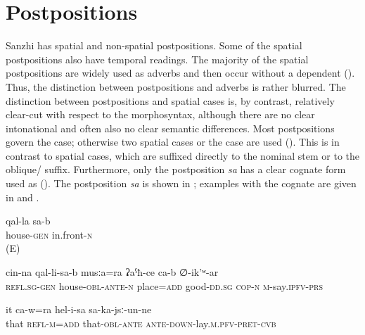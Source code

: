 \chapter{Postpositions}\label{cpt:postpositions}

Sanzhi has spatial and non-spatial postpositions. Some of the spatial postpositions also have temporal readings. The majority of the spatial postpositions are widely used as adverbs and then occur without a dependent  (). Thus, the distinction between postpositions and adverbs is rather blurred. The distinction between postpositions and spatial cases is, by contrast, relatively clear-cut with respect to the morphosyntax, although there are no clear intonational and often also no clear semantic differences. Most postpositions govern the  case; otherwise two spatial cases or the  case are used (). This is in contrast to spatial cases, which are suffixed directly to the nominal stem or to the oblique/ suffix. Furthermore, only the postposition \textit{sa} has a clear cognate form used as  (). The postposition \textit{sa} is shown in ; examples with the cognate  are given in  and . 

\begin{exe}
	\ex	
	\begin{xlist}
			\ex	\label{in front of the house}
		\gll	qal-la	sa-b \\
			house-\textsc{gen}	in.front-\textsc{n}\\
		\glt	{} (E)
		
		\ex	\label{In front of his house there is also a good area, he says}
		\gll	cin-na	qal-li-sa-b	musːa=ra	ʡaˁħ-ce	ca-b ∅-ik'ʷ-ar\\
			\textsc{refl}.\textsc{sg}-\textsc{gen}	house-\textsc{obl}-\textsc{ante}-\textsc{n}	place=\textsc{add} good-\textsc{dd}.\textsc{sg} \textsc{cop-n}	\textsc{m}-say.\textsc{ipfv}-\textsc{prs}\\
		\glt	{}

		\ex	\label{he himself also slept in front of it}
		\gll	it	ca-w=ra	hel-i-sa	sa-ka-jsː-un-ne\\
			that	\textsc{refl}-\textsc{m}=\textsc{add}	that-\textsc{obl}-\textsc{ante}	\textsc{ante-down}-lay.\textsc{m}.\textsc{pfv}-\textsc{pret}-\textsc{cvb}\\
		\glt	{}
	\end{xlist}
\end{exe}

